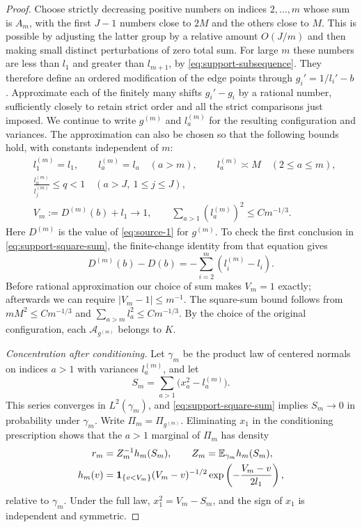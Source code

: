 \begin{proof}
Choose strictly decreasing positive numbers on indices $2,\ldots,m$
whose sum is $A_m$, with the first $J-1$ numbers close to $2M$ and the
others close to $M$.  This is possible by adjusting the latter group
by a relative amount $O(J/m)$ and then making small distinct
perturbations of zero total sum.  For large $m$ these numbers are less
than $l_1$ and greater than $l_{m+1}$, by
\eqref{eq:support-subsequence}.  They therefore define an ordered
modification of the edge points through $g_i'=1/l_i'-b$.
Approximate each of the finitely many shifts $g_i'-g_i$ by a rational
number, sufficiently closely to retain strict order and all the strict
comparisons just imposed.  We continue to write $g^{(m)}$ and $l_a^{(m)}$
for the resulting configuration and variances.  The approximation can
also be chosen so that the following bounds hold, with constants
independent of $m$:
\begin{align}
 &l_1^{(m)}=l_1,\qquad l_a^{(m)}=l_a\quad(a>m),
       \qquad l_a^{(m)}\asymp M\quad(2\le a\le m),
       \label{eq:support-variances}\\
 &\frac{l_a^{(m)}}{l_j^{(m)}}\le q<1
       \quad(a>J,\ 1\le j\le J),
       \label{eq:support-separation}\\
 &V_m:=D^{(m)}(b)+l_1\longrightarrow1,
       \qquad
       \sum_{a>1}(l_a^{(m)})^2\le C m^{-1/3}.
       \label{eq:support-square-sum}
\end{align}
Here $D^{(m)}$ is the value of \eqref{eq:source-1} for $g^{(m)}$.
To check the first conclusion in \eqref{eq:support-square-sum}, the
finite-change identity from that equation gives
\[
 D^{(m)}(b)-D(b)
   =-\sum_{i=2}^m(l_i^{(m)}-l_i).
\]
Before rational approximation our choice of sum makes $V_m=1$ exactly;
afterwards we can require $|V_m-1|\le m^{-1}$.
The square-sum bound follows from $mM^2\le C m^{-1/3}$ and
$\sum_{a>m}l_a^2\le C m^{-1/3}$.  By the choice of the original
configuration, each $\mathcal A_{g^{(m)}}$ belongs to $K$.

\medskip\noindent
\emph{Concentration after conditioning.}
Let $\gamma_m$ be the product law of centered normals on indices $a>1$
with variances $l_a^{(m)}$, and let
\[
 S_m=\sum_{a>1}\bigl(x_a^2-l_a^{(m)}\bigr).
\]
This series converges in $L^2(\gamma_m)$, and
\eqref{eq:support-square-sum} implies $S_m\to0$ in probability under
$\gamma_m$.  Write $\Pi_m=\Pi_{g^{(m)}}$.  Eliminating $x_1$ in the
conditioning prescription shows that the $a>1$ marginal of $\Pi_m$
has density
\begin{equation}\label{eq:support-tail-density}
 \begin{aligned}
 r_m&=Z_m^{-1}h_m(S_m),\qquad Z_m=\mathbb E_{\gamma_m}h_m(S_m),\\
 h_m(v)&=\mathbf 1_{\{v<V_m\}}(V_m-v)^{-1/2}
             \exp\left(-\frac{V_m-v}{2l_1}\right),
 \end{aligned}
\end{equation}
relative to $\gamma_m$.  Under the full law, $x_1^2=V_m-S_m$,
and the sign of $x_1$ is independent and symmetric.


\end{proof}
